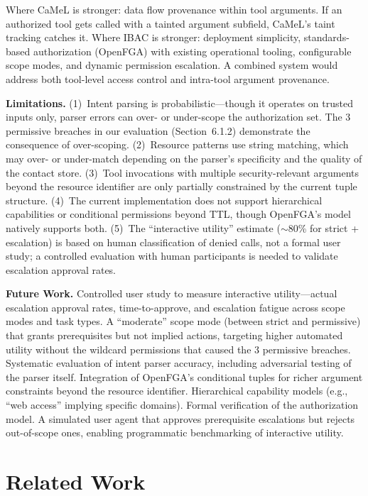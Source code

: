 \documentclass[11pt]{article}
\begin{document}
Where CaMeL is stronger: data flow provenance within tool arguments. If an authorized tool gets called with a tainted argument subfield, CaMeL's taint tracking catches it. Where IBAC is stronger: deployment simplicity, standards-based authorization (OpenFGA) with existing operational tooling, configurable scope modes, and dynamic permission escalation. A combined system would address both tool-level access control and intra-tool argument provenance.

\textbf{Limitations.} (1)~Intent parsing is probabilistic---though it operates on trusted inputs only, parser errors can over- or under-scope the authorization set. The 3 permissive breaches in our evaluation (Section~6.1.2) demonstrate the consequence of over-scoping. (2)~Resource patterns use string matching, which may over- or under-match depending on the parser's specificity and the quality of the contact store. (3)~Tool invocations with multiple security-relevant arguments beyond the resource identifier are only partially constrained by the current tuple structure. (4)~The current implementation does not support hierarchical capabilities or conditional permissions beyond TTL, though OpenFGA's model natively supports both. (5)~The ``interactive utility'' estimate (${\sim}$80\% for strict + escalation) is based on human classification of denied calls, not a formal user study; a controlled evaluation with human participants is needed to validate escalation approval rates.

\textbf{Future Work.} Controlled user study to measure interactive utility---actual escalation approval rates, time-to-approve, and escalation fatigue across scope modes and task types. A ``moderate'' scope mode (between strict and permissive) that grants prerequisites but not implied actions, targeting higher automated utility without the wildcard permissions that caused the 3 permissive breaches. Systematic evaluation of intent parser accuracy, including adversarial testing of the parser itself. Integration of OpenFGA's conditional tuples for richer argument constraints beyond the resource identifier. Hierarchical capability models (e.g., ``web access'' implying specific domains). Formal verification of the authorization model. A simulated user agent that approves prerequisite escalations but rejects out-of-scope ones, enabling programmatic benchmarking of interactive utility.

\section{Related Work}
\end{document}
